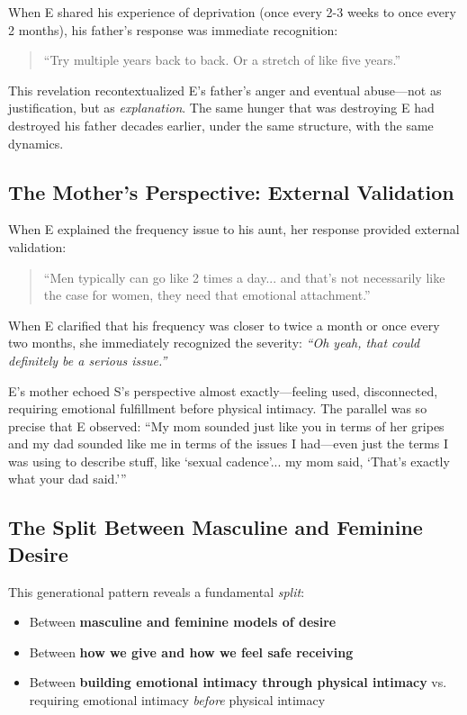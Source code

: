 \documentclass[12pt,openany]{book}
\numberwithin{equation}{chapter}
\begin{document}
When E shared his experience of deprivation (once every 2-3 weeks to once every 2 months), his father's response was immediate recognition:

\begin{quote}
``Try multiple years back to back. Or a stretch of like five years.''
\end{quote}

This revelation recontextualized E's father's anger and eventual abuse---not as justification, but as \textit{explanation}. The same hunger that was destroying E had destroyed his father decades earlier, under the same structure, with the same dynamics.

\subsection{The Mother's Perspective: External Validation}

When E explained the frequency issue to his aunt, her response provided external validation:

\begin{quote}
``Men typically can go like 2 times a day... and that's not necessarily like the case for women, they need that emotional attachment.''
\end{quote}

When E clarified that his frequency was closer to twice a month or once every two months, she immediately recognized the severity: \textit{``Oh yeah, that could definitely be a serious issue.''}

E's mother echoed S's perspective almost exactly---feeling used, disconnected, requiring emotional fulfillment before physical intimacy. The parallel was so precise that E observed: ``My mom sounded just like you in terms of her gripes and my dad sounded like me in terms of the issues I had---even just the terms I was using to describe stuff, like `sexual cadence'... my mom said, `That's exactly what your dad said.'''

\subsection{The Split Between Masculine and Feminine Desire}

This generational pattern reveals a fundamental \textit{split}:

\begin{itemize}
    \item Between \textbf{masculine and feminine models of desire}
    \item Between \textbf{how we give and how we feel safe receiving}
    \item Between \textbf{building emotional intimacy through physical intimacy} vs. requiring emotional intimacy \textit{before} physical intimacy
\end{itemize}
\end{document}
